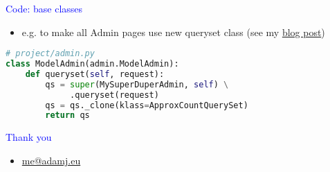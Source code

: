 \documentclass[landscape]{slides}
\begin{document}
\begin{slide}

    \textcolor{blue}{\Large{Code: base classes}}

    \begin{itemize}
        \item e.g. to make all Admin pages use new queryset class (see my \href{http://adamj.eu/tech/2014/07/16/extending-djangos-queryset-to-return-approximate-counts/}{blog post})
    \end{itemize}


    \begin{lstlisting}[language=Python]
# project/admin.py
class ModelAdmin(admin.ModelAdmin):
    def queryset(self, request):
        qs = super(MySuperDuperAdmin, self) \
             .queryset(request)
        qs = qs._clone(klass=ApproxCountQuerySet)
        return qs
    \end{lstlisting}

\end{slide}



\begin{slide}
    \textcolor{blue}{\Large{Thank you}}

    \begin{itemize}
        \item \url{me@adamj.eu}
    \end{itemize}

\end{slide}
\end{document}
